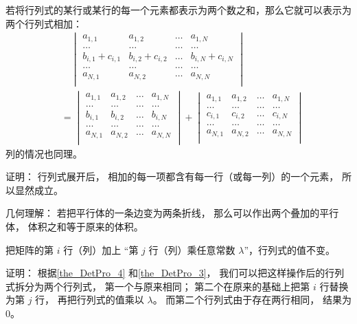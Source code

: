 \begin{theorem}{}\label{the_DetPro_4}
若将行列式的某行或某行的每一个元素都表示为两个数之和，那么它就可以表示为两个行列式相加：
\begin{equation}\label{eq_DetPro_1}
\begin{aligned}
&\quad\begin{vmatrix}
a_{1,1} & a_{1,2} & \dots & a_{1,N}\\
\dots & \dots & \dots & \dots\\
b_{i,1} + c_{i,1} & b_{i, 2} + c_{i, 2} & \dots & b_{i,N} + c_{i,N}\\
\dots & \dots & \dots & \dots\\
a_{N,1} & a_{N,2} & \dots & a_{N,N}\\
\end{vmatrix}\\
&=
\begin{vmatrix}
a_{1,1} & a_{1,2} & \dots & a_{1,N}\\
\dots & \dots & \dots & \dots\\
b_{i,1} & b_{i, 2} & \dots & b_{i,N}\\
\dots & \dots & \dots & \dots\\
a_{N,1} & a_{N,2} & \dots & a_{N,N}\\
\end{vmatrix}
+
\begin{vmatrix}
a_{1,1} & a_{1,2} & \dots & a_{1,N}\\
\dots & \dots & \dots & \dots\\
c_{i,1} & c_{i, 2} & \dots & c_{i,N}\\
\dots & \dots & \dots & \dots\\
a_{N,1} & a_{N,2} & \dots & a_{N,N}\\
\end{vmatrix}
\end{aligned}
\end{equation}
列的情况也同理。
\end{theorem}
证明： 行列式展开后， 相加的每一项都含有每一行（或每一列）的一个元素， 所以显然成立。

几何理解： 若把平行体的一条边变为两条折线， 那么可以作出两个叠加的平行体， 体积之和等于原来的体积。

\begin{theorem}{ }\label{the_DetPro_5}
把矩阵的第 $i$ 行（列）加上 “第 $j$ 行（列）乘任意常数 $\lambda$”，行列式的值不变。
\end{theorem}
证明： 根据\autoref{the_DetPro_4} 和\autoref{the_DetPro_3}， 我们可以把这样操作后的行列式拆分为两个行列式， 第一个与原来相同； 第二个在原来的基础上把第 $i$ 行替换为第 $j$ 行， 再把行列式的值乘以 $\lambda$。 而第二个行列式由于存在两行相同， 结果为 0。

